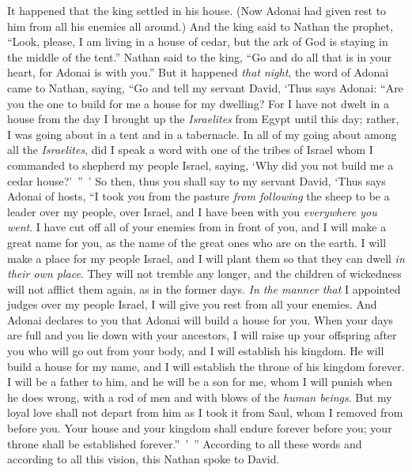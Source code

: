 \begin{biblechapter} %
 It happened that the king settled in his house. (Now Adonai had given rest to him from all his enemies all around.)
\verse And the king said to Nathan the prophet, “Look, please, I am living in a house of cedar, but the ark of God is staying in the middle of the tent.”
\verse Nathan said to the king, “Go and do all that is in your heart, for Adonai is with you.”
\verse But it happened \textit{that night}, the word of Adonai came to Nathan, saying,
\verse “Go and tell my servant David, ‘Thus says Adonai: “Are you the one to build for me a house for my dwelling?
\verse For I have not dwelt in a house from the day I brought up the \textit{Israelites} from Egypt until this day; rather, I was going about in a tent and in a tabernacle.
\verse In all of my going about among all the \textit{Israelites}, did I speak a word with one of the tribes of Israel whom I commanded to shepherd my people Israel, saying, ‘Why did you not build me a cedar house?’ ” ’
\verse So then, thus you shall say to my servant David, ‘Thus says Adonai of hosts, “I took you from the pasture \textit{from following} the sheep to be a leader over my people, over Israel,
\verse and I have been with you \textit{everywhere you went}. I have cut off all of your enemies from in front of you, and I will make a great name for you, as the name of the great ones who are on the earth.
\verse I will make a place for my people Israel, and I will plant them so that they can dwell \textit{in their own place}. They will not tremble any longer, and the children of wickedness will not afflict them again, as in the former days.
\verse \textit{In the manner that} I appointed judges over my people Israel, I will give you rest from all your enemies. And Adonai declares to you that Adonai will build a house for you.
\verse When your days are full and you lie down with your ancestors, I will raise up your offspring after you who will go out from your body, and I will establish his kingdom.
\verse He will build a house for my name, and I will establish the throne of his kingdom forever.
\verse I will be a father to him, and he will be a son for me, whom I will punish when he does wrong, with a rod of men and with blows of the \textit{human beings}.
\verse But my loyal love shall not depart from him as I took it from Saul, whom I removed from before you.
\verse Your house and your kingdom shall endure forever before you; your throne shall be established forever.” ’ ”
 According to all these words and according to all this vision, this Nathan spoke to David.

\end{biblechapter}
